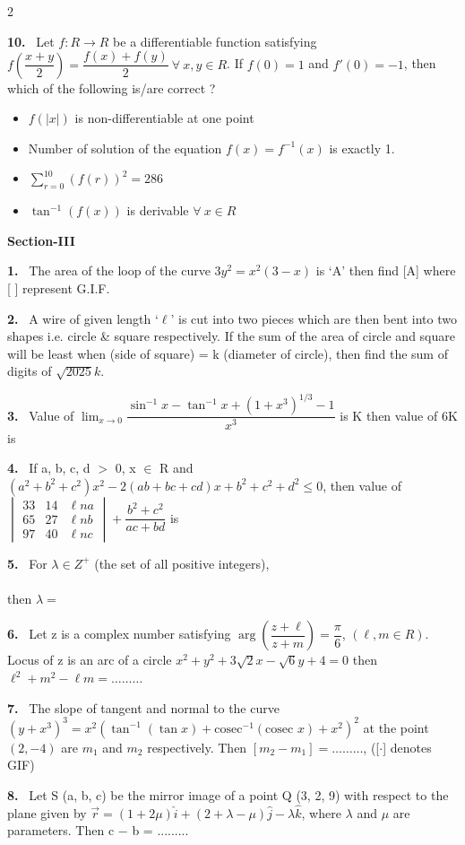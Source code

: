 \documentclass[10pt]{extarticle}
\newcommand{\sect}[1]{\par\smallskip\noindent\textbf{#1}\par}
\newcommand{\qn}[1]{\par\smallskip\noindent\textbf{#1.}~}
\newenvironment{qoptions}{\begin{itemize}[leftmargin=1.8em,itemsep=1pt,topsep=2pt,label={}]}{\end{itemize}}
\newcommand{\opt}[2]{\item[(#1)] #2}
\begin{document}
\begin{multicols}{2}
\qn{10} Let $f:R\to R$ be a differentiable function satisfying $f\left(\dfrac{x+y}2\right)=\dfrac{f(x)+f(y)}2\ \forall\ x,y\in R$. If $f(0)=1$ and $f'(0)=-1$, then which of the following is/are correct ?
\begin{qoptions}
\opt{A}{$f(|x|)$ is non-differentiable at one point}
\opt{B}{Number of solution of the equation $f(x)=f^{-1}(x)$ is exactly 1.}
\opt{C}{$\displaystyle\sum_{r=0}^{10}(f(r))^2=286$}
\opt{D}{$\tan^{-1}(f(x))$ is derivable $\forall\ x\in R$}
\end{qoptions}

\sect{Section-III}

\qn{1} The area of the loop of the curve $3y^2=x^2(3-x)$ is `A' then find [A] where [ ] represent G.I.F.

\qn{2} A wire of given length `$\ell$' is cut into two pieces which are then bent into two shapes i.e. circle \& square respectively. If the sum of the area of circle and square will be least when (side of square) = k (diameter of circle), then find the sum of digits of $\sqrt{2025}k$.

\qn{3} Value of $\displaystyle\lim_{x\to0}\dfrac{\sin^{-1}x-\tan^{-1}x+\left(1+x^3\right)^{1/3}-1}{x^3}$ is K then value of 6K is

\qn{4} If a, b, c, d $>$ 0, x $\in$ R and $\left(a^2+b^2+c^2\right)x^2-2(ab+bc+cd)x+b^2+c^2+d^2\leqslant0$, then value of $\begin{vmatrix}33&14&\ell na\\65&27&\ell nb\\97&40&\ell nc\end{vmatrix}+\dfrac{b^2+c^2}{ac+bd}$ is

\qn{5} For $\lambda\in Z^+$ (the set of all positive integers),\\
\\
then $\lambda=$

\qn{6} Let z is a complex number satisfying $\arg\left(\dfrac{z+\ell}{z+m}\right)=\dfrac\pi6$, $(\ell,m\in R)$. Locus of z is an arc of a circle $x^2+y^2+3\sqrt2x-\sqrt6y+4=0$ then $\ell^2+m^2-\ell m=\dots\dots\dots$

\qn{7} The slope of tangent and normal to the curve $\left(y+x^3\right)^3=x^2\left(\tan^{-1}(\tan x)+\text{cosec}^{-1}(\text{cosec }x)+x^2\right)^2$ at the point $(2,-4)$ are $m_1$ and $m_2$ respectively. Then $[m_2-m_1]=\dots\dots\dots$, ([$\cdot$] denotes GIF)

\qn{8} Let S (a, b, c) be the mirror image of a point Q (3, 2, 9) with respect to the plane given by $\vec r=(1+2\mu)\hat i+(2+\lambda-\mu)\hat j-\lambda\hat k$, where $\lambda$ and $\mu$ are parameters. Then c $-$ b = .........

\end{multicols}
\end{document}
